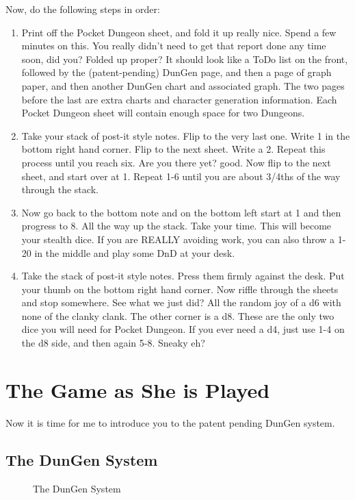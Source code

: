 \documentclass[a6paper,hidelinks]{article}
\begin{document}
Now, do the following steps in order:
\begin{enumerate}
\item Print off the Pocket Dungeon sheet, and fold it up really nice. Spend a few minutes on this. You really didn't need to get that report done any time soon, did you? Folded up proper? It should look like a ToDo list on the front, followed by the (patent-pending) DunGen page, and then a page of graph paper, and then another DunGen chart and associated graph. The two pages before the last are extra charts and character generation information. Each Pocket Dungeon sheet will contain enough space for two Dungeons.
\item Take your stack of post-it style notes. Flip to the very last one. Write 1 in the bottom right hand corner. Flip to the next sheet. Write a 2. Repeat this process until you reach six. Are you there yet? good. Now flip to the next sheet, and start over at 1. Repeat 1-6 until you are about 3/4ths of the way through the stack.
\item Now go back to the bottom note and on the bottom left start at 1 and then progress to 8. All the way up the stack. Take your time. This will become your
stealth dice. If you are REALLY avoiding work, you can also throw a 1-20 in the middle and play some DnD at your desk.
\item Take the stack of post-it style notes. Press them firmly against the desk. Put your thumb on the bottom right hand corner. Now riffle through the sheets and stop somewhere. See what we just did? All the random joy of a d6 with none of the clanky clank. The other corner is a d8. These are the only two dice you will need for Pocket Dungeon. If you ever need a d4, just use 1-4 on the d8 side, and then again 5-8. Sneaky eh?

\end{enumerate}

\section{The Game as She is Played}

Now it is time for me to introduce you to the patent pending DunGen system.

\subsection{The DunGen System}

\begin{figure}[!]
\caption{The DunGen System}
\label{fig:the_dungen_system}
\tiny{

}
\end{figure}
\end{document}
